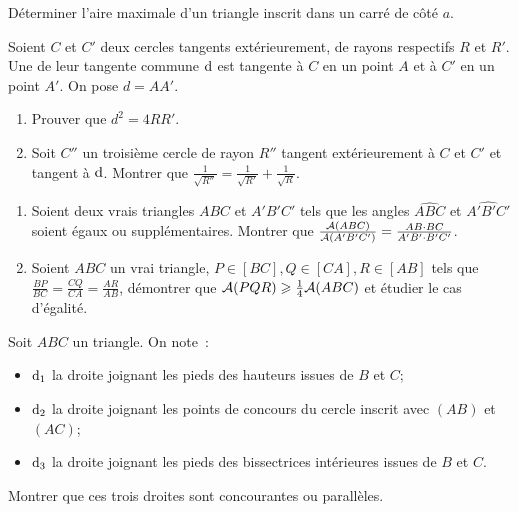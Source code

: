 \begin{exercice}
    Déterminer l'aire maximale d'un triangle inscrit dans un carré de côté 
    \(a\).
\end{exercice}

\begin{exercice}
    Soient \(C\) et \(C'\) deux cercles tangents extérieurement, de rayons 
    respectifs \(R\) et \(R'\). Une de leur tangente commune \(\mathrm{d}\) est tangente 
    à \(C\) en un point \(A\) et à \(C'\) en un point \(A'\). On pose \(d = 
    AA'\).
    \begin{enumerate}
        \item Prouver que \(d^2 = 4RR'\).
        \item Soit \(C''\) un troisième cercle de rayon \(R''\) tangent 
            extérieurement à \(C\) et \(C'\) et tangent à \(\mathrm{d}\). Montrer que 
            \(\frac{1}{\sqrt{R''}} = \frac{1}{\sqrt{R'}} + \frac{1}{\sqrt{R}}\).
    \end{enumerate}
\end{exercice}

\begin{exercice}
    \begin{enumerate}
        \item Soient deux vrais triangles \(ABC\) et \(A'B'C'\) tels que les 
            angles \(\widehat{ABC}\) et \(\widehat{A'B'C'}\) soient égaux ou 
            supplémentaires. Montrer que \(\frac{\mathcal{A}(ABC)}{\mathcal{A}(A'B'C')} = \frac{AB 
            \cdot BC}{A'B' \cdot B'C'}\).
        \item Soient \(ABC\) un vrai triangle, \(P \in [BC], Q \in [CA], R \in 
            [AB]\) tels que \(\frac{BP}{BC} = \frac{CQ}{CA} = \frac{AR}{AB}\), 
            démontrer que \(\mathcal{A}(PQR) \geqslant \frac{1}{4} \mathcal{A}(ABC)\) et étudier 
            le cas d'égalité.
    \end{enumerate}
\end{exercice}

\begin{exercice}
    Soit \(ABC\) un triangle. On note~:
    \begin{itemize}
        \item \(\mathrm{d}_1\) la droite joignant les pieds des hauteurs issues de \(B\) 
            et \(C\);
        \item \(\mathrm{d}_2\) la droite joignant les points de concours du cercle 
            inscrit avec \((AB)\) et \((AC)\);
        \item \(\mathrm{d}_3\) la droite joignant les pieds des bissectrices intérieures 
            issues de \(B\) et \(C\).
    \end{itemize}
    Montrer que ces trois droites sont concourantes ou parallèles.
\end{exercice}

